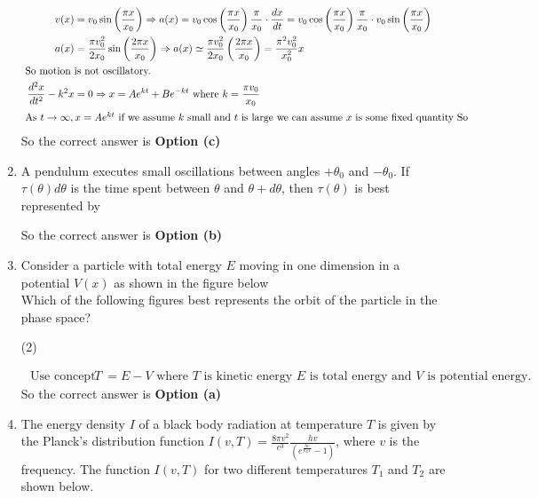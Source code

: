 \begin{enumerate}
\begin{answer}
\begin{align*}
	v(x)&=v_{0} \sin \left(\frac{\pi x}{x_{0}}\right) \Rightarrow a(x)=v_{0} \cos \left(\frac{\pi x}{x_{0}}\right) \frac{\pi}{x_{0}} \cdot \frac{d x}{d t}=v_{0} \cos \left(\frac{\pi x}{x_{0}}\right) \frac{\pi}{x_{0}} \cdot v_{0} \sin \left(\frac{\pi x}{x_{0}}\right)\\
	a(x)&=\frac{\pi v_{0}^{2}}{2 x_{0}} \sin \left(\frac{2 \pi x}{x_{0}}\right) \Rightarrow a(x) \simeq \frac{\pi v_{0}^{2}}{2 x_{0}}\left(\frac{2 \pi x}{x_{0}}\right)=\frac{\pi^{2} v_{0}^{2}}{x_{0}^{2}} x\\
\text{	So motion }&\text{is not oscillatory.}\\
	\frac{d^{2} x}{d t^{2}}-k^{2} x&=0 \Rightarrow x=A e^{k t}+B e^{-k t} \text { where } k=\frac{\pi v_{0}}{x_{0}}\\
\intertext{	As $t \rightarrow \infty, x=A e^{k t}$ if we assume $k$ small and $t$ is large we can assume $x$ is some fixed quantity So}
	\end{align*}
		So the correct answer is \textbf{Option (c)}
\end{answer}
\item  A pendulum executes small oscillations between angles $+\theta_{0}$ and $-\theta_{0}$. If $\tau(\theta) d \theta$ is the time spent between $\theta$ and $\theta+d \theta$, then $\tau(\theta)$ is best represented by
\begin{answer}
	So the correct answer is \textbf{Option (b)}
\end{answer}
\item Consider a particle with total energy $E$ moving in one dimension in a potential $V(x)$ as shown in the figure below\\
Which of the following figures best represents the orbit of the particle in the phase space?
	 \begin{tasks}(2)
		\task[\textbf{a.}]
		\task[\textbf{b.}]
		\task[\textbf{c.}]
		\task[\textbf{d.}] 
	\end{tasks}
\begin{answer}
	\begin{align*}
	\text { Use concept } T&=E-V \text { where } T \text { is kinetic energy } E \text { is total energy and } V \text { is potential energy. }
	\end{align*}
	So the correct answer is \textbf{Option (a)}
\end{answer}
\item The energy density $I$ of a black body radiation at temperature $T$ is given by the Planck's distribution function $I(v, T)=\frac{8 \pi v^{2}}{c^{3}} \frac{h v}{\left(e^{\frac{h v}{k_{B} T}}-1\right)}$, where $v$ is the frequency. The function $I(v, T)$ for two different temperatures $T_{1}$ and $T_{2}$ are shown below.\\

\end{enumerate}
